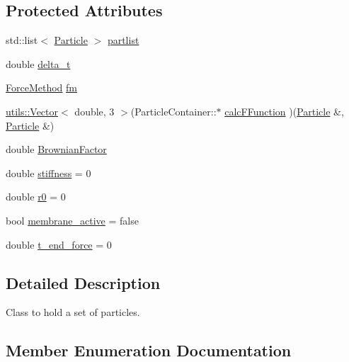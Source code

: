 \subsection*{Protected Attributes}
\begin{DoxyCompactItemize}
\item 
std\+::list$<$ \hyperlink{classParticle}{Particle} $>$ \hyperlink{classParticleContainer_aad341e230fc4533690e0db8a4c9126f4}{partlist}
\item 
double \hyperlink{classParticleContainer_a00ee8dcd9a5c11b54e8fc731d38b45fa}{delta\+\_\+t}
\item 
\hyperlink{classParticleContainer_a2457078eafdf0fdd9eeb977e63aed6e8}{Force\+Method} \hyperlink{classParticleContainer_a839c3ff474bfece04fcbb0ca3fe9a0f8}{fm}
\item 
\hyperlink{classutils_1_1Vector}{utils\+::\+Vector}$<$ double, 3 $>$(Particle\+Container\+::$\ast$ \hyperlink{classParticleContainer_a3827ee46dac1ac38cc1312c6e7dae493}{calc\+F\+Function} )(\hyperlink{classParticle}{Particle} \&, \hyperlink{classParticle}{Particle} \&)
\item 
double \hyperlink{classParticleContainer_a64e8a768554b5b6126755e8a8e85f2f5}{Brownian\+Factor}
\item 
double \hyperlink{classParticleContainer_a3a00b0487e24b68b5cedc29087221f00}{stiffness} = 0
\item 
double \hyperlink{classParticleContainer_a50a0c62bf198ef1e37fe5c4d64a4a95a}{r0} = 0
\item 
bool \hyperlink{classParticleContainer_a9a051bfdd0e558ad4637335406c14fad}{membrane\+\_\+active} = false
\item 
double \hyperlink{classParticleContainer_aaa12218c40cf5d8f2421d5cc09fcafc0}{t\+\_\+end\+\_\+force} = 0
\end{DoxyCompactItemize}


\subsection{Detailed Description}
Class to hold a set of particles. 



\subsection{Member Enumeration Documentation}
